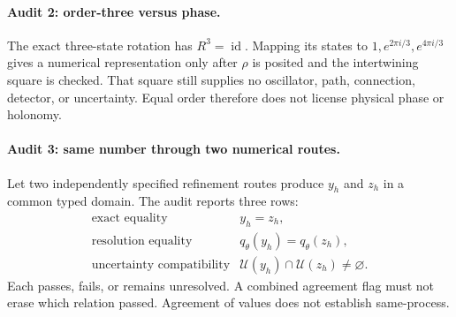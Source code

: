 \paragraph{Audit 2: order-three versus phase.}
The exact three-state rotation has \(R^3=\operatorname{id}\).  Mapping its states to
\(1,e^{2\pi i/3},e^{4\pi i/3}\) gives a numerical representation only after \(\rho\) is posited and the intertwining
square is checked.  That square still supplies no oscillator, path, connection, detector, or uncertainty.  Equal
order therefore does not license physical phase or holonomy.

\paragraph{Audit 3: same number through two numerical routes.}
Let two independently specified refinement routes produce \(y_h\) and \(z_h\) in a common typed domain.  The audit
reports three rows:
\[
\begin{array}{ll}
\text{exact equality}&y_h=z_h,\\
\text{resolution equality}&q_\theta(y_h)=q_\theta(z_h),\\
\text{uncertainty compatibility}&\mathcal U(y_h)\cap\mathcal U(z_h)\ne\varnothing.
\end{array}
\]
Each passes, fails, or remains unresolved.  A combined agreement flag must not erase which relation passed.
Agreement of values does not establish same-process.

